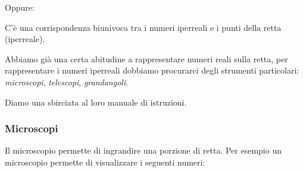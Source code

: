 Oppure:

\begin{postulato}
C'è una corrispondenza biunivoca tra i numeri iperreali e 
i punti della retta (iperreale).
\end{postulato}

Abbiamo già una certa abitudine a rappresentare numeri reali sulla retta, 
per rappresentare i numeri iperreali dobbiamo procurarci degli strumenti 
particolari: \emph{microscopi}, \emph{telescopi}, \emph{grandangoli}.

Diamo una sbirciata al loro manuale di istruzioni.

\subsubsection{Microscopi}
\label{subsec:insnum_microscopio}

Il microscopio permette di ingrandire una porzione di retta. 
Per esempio un microscopio permette di visualizzare i seguenti numeri:

